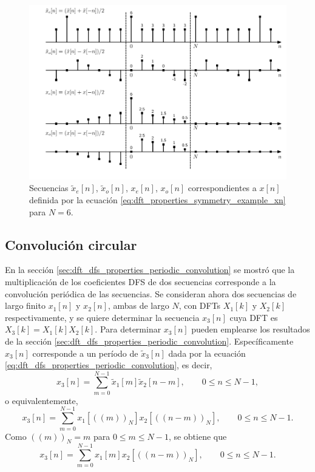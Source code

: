 \documentclass[a4paper]{report}
\begin{document}
\begin{figure}[!htb]
 \begin{center}
 \includegraphics[width=1\textwidth]{figuras/dft_properties_symmetry_decomposition.pdf}
 \caption{\label{fig:dft_properties_symmetry_decomposition} Secuencias \(\tilde{x}_e[n]\), \(\tilde{x}_o[n]\), \(x_e[n]\), \(x_o[n]\) correspondientes a \(x[n]\) definida por la ecuación \ref{eq:dft_properties_symmetry_example_xn} para \(N=6\).}
 \end{center}
\end{figure}

\subsection{Convolución circular}\label{sec:dft_properties_circular_convolution}

En la sección \ref{sec:dft_dfs_properties_periodic_convolution} se mostró que la multiplicación de los coeficientes DFS de dos secuencias corresponde a la convolución periódica de las secuencias. Se consideran ahora dos secuencias de largo finito \(x_1[n]\) y \(x_2[n]\), ambas de largo \(N\), con DFTs \(X_1[k]\) y \(X_2[k]\) respectivamente, y se quiere determinar la secuencia \(x_3[n]\) cuya DFT es \(X_3[k]=X_1[k]X_2[k]\). Para determinar \(x_3[n]\) pueden emplearse los resultados de la sección \ref{sec:dft_dfs_properties_periodic_convolution}. Específicamente \(x_3[n]\) corresponde a un período de \(\tilde{x}_3[n]\) dada por la ecuación \ref{eq:dft_dfs_properties_periodic_convolution}, es decir,
\[
 x_3[n]=\sum_{m=0}^{N-1}\tilde{x}_1[m]\tilde{x}_2[n-m],
 \qquad 0\leq n\leq N-1,
\]
o equivalentemente,
\[
 x_3[n]=\sum_{m=0}^{N-1}x_1[((m))_N]x_2[((n-m))_N],
 \qquad 0\leq n\leq N-1.
\]
Como \(((m))_N=m\) para \(0\leq m\leq N-1\), se obtiene que 
\begin{equation}\label{eq:dft_properties_circular_convolution_definition}
 x_3[n]=\sum_{m=0}^{N-1}x_1[m]x_2[((n-m))_N],
 \qquad 0\leq n\leq N-1. 
\end{equation}
\end{document}
